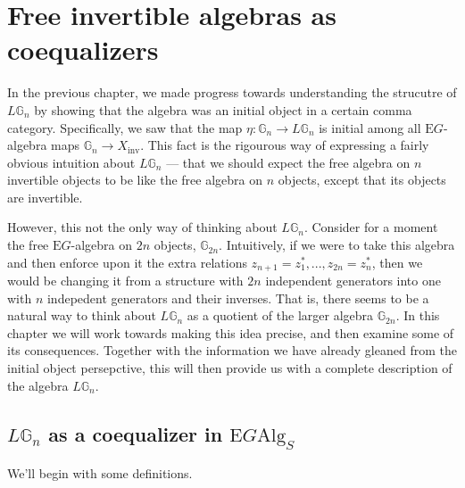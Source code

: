 \section{Free invertible algebras as coequalizers}
\label{coeqalgebra}

In the previous chapter, we made progress towards understanding the strucutre of $L\mathbb{G}_n$ by showing that the algebra was an initial object in a certain comma category. Specifically, we saw that the map $\eta: \mathbb{G}_n \to L\mathbb{G}_n$ is initial among all $\mathrm{E}G$-algebra maps $\mathbb{G}_n \to X_{\mathrm{inv}}$. This fact is the rigourous way of expressing a fairly obvious intuition about $L\mathbb{G}_n$ --- that we should expect the free algebra on $n$ invertible objects to be like the free algebra on $n$ objects, except that its objects are invertible.

However, this not the only way of thinking about $L\mathbb{G}_n$. Consider for a moment the free $\mathrm{E}G$-algebra on $2n$ objects, $\mathbb{G}_{2n}$. Intuitively, if we were to take this algebra and then enforce upon it the extra relations $z_{n+1} = z_1^*, ..., z_{2n} = z_n^*$, then we would be changing it from a structure with $2n$ independent generators into one with $n$ indepedent generators and their inverses. That is, there seems to be a natural way to think about $L\mathbb{G}_n$ as a quotient of the larger algebra $\mathbb{G}_{2n}$. In this chapter we will work towards making this idea precise, and then examine some of its consequences. Together with the information we have already gleaned from the initial object persepctive, this will then provide us with a complete description of the algebra $L\mathbb{G}_n$.

\subsection{$L\mathbb{G}_n$ as a coequalizer in $\mathrm{E}G\mathrm{Alg}_S$} 

We'll begin with some definitions.

